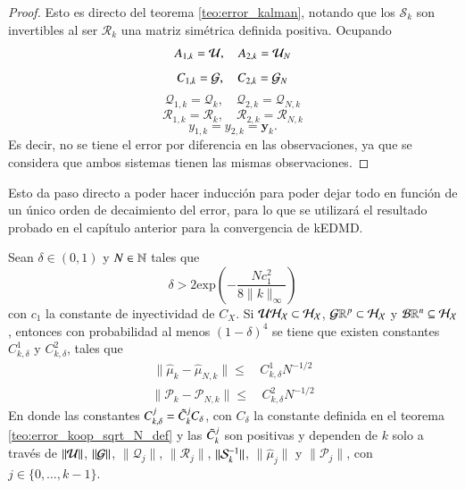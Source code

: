 \begin{proof}
    Esto es directo del teorema \ref{teo:error_kalman}, notando que los $\mathcal{S}_k$ son invertibles al ser $\mathcal{R}_k$ una matriz simétrica definida positiva. Ocupando
    \begin{equation*}
        A_{1,k} = \U, \quad A_{2,k} = \U_N 
    \end{equation*}
    \begin{equation*}
        C_{1,k} = \G, \quad C_{2,k} = \G_N 
    \end{equation*}
    \begin{equation*}
        \mathcal{Q}_{1,k} = \mathcal{Q}_k, \quad \mathcal{Q}_{2,k} = \mathcal{Q}_{N, k}
    \end{equation*}
    \begin{equation*}
        \mathcal{R}_{1,k} = \mathcal{R}_k, \quad \mathcal{R}_{2,k} = \mathcal{R}_{N, k}
    \end{equation*}
    \begin{equation*}
        y_{1, k} = y_{2, k} = \mathbf{y}_k.
    \end{equation*}
    Es decir, no se tiene el error por diferencia en las observaciones, ya que se considera que ambos sistemas tienen las mismas observaciones.
\end{proof}

Esto da paso directo a poder hacer inducción para poder dejar todo en función de un único orden de decaimiento del error, para lo que se utilizará el resultado probado en el capítulo anterior para la convergencia de kEDMD. 

\begin{teo}
    Sean $\delta \in (0, 1)$ y $N \in \N$ tales que
\[
\delta > 2 \text{exp} \left ( -\frac{Nc_1^2}{8\|k\|_\infty}\right )
\]
con $c_1$ la constante de inyectividad de $C_X$. Si $\U \H_\X \subset \H_\X$, $\G \R^p \subset \H_\X$ y $\B \R^n \subseteq \H_\X$, entonces con probabilidad al menos $(1 - \delta)^4$ se tiene que existen constantes $C_{k,\delta}^1$ y $C_{k,\delta}^2$, tales que
	\begin{equation*}
		\begin{aligned}
			\| \hat \mu_{k} - \hat \mu_{N,k}  \| \leq & \, C_{k, \delta}^1 N^{-1/2}
		\end{aligned}
	\end{equation*}
	\begin{equation*}
		\begin{aligned}
			\| \mathcal{P}_{k} - \mathcal{P}_{N,k}  \| \leq & \, C_{k, \delta}^2 N^{-1/2} 
		\end{aligned}
	\end{equation*}
	En donde las constantes $C_{k,\delta}^j = \Tilde{C}_k^j C_\delta$, con $C_\delta$ la constante definida en el teorema \ref{teo:error_koop_sqrt_N_def} y las $\Tilde{C}_k^j$ son positivas y dependen de $k$ solo a través de $\| \U \| $, $\| \G \| $, $\| \mathcal{Q}_{j} \| $, $\| \mathcal{R}_{j} \| $, $\| \S_{k}^{-1} \| $, $\| \hat{\mu}_{j} \| $ y $\| \mathcal{P}_{j} \| $, con $j \in \{ 0, \dots, k-1\}$.
    \label{teo:teo_kerKKF_2}
\end{teo}

